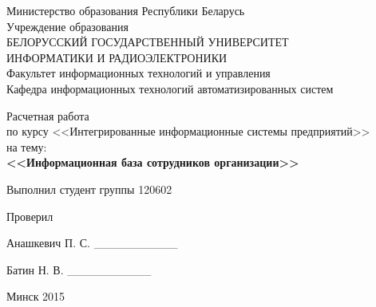 \begin{titlepage}
\thispagestyle{empty}
\setlength{\parindent}{0ex} %

\begin{center}
  Министерство образования Республики Беларусь \\
  \smallskip
  Учреждение образования \\
  БЕЛОРУССКИЙ ГОСУДАРСТВЕННЫЙ УНИВЕРСИТЕТ \\
  ИНФОРМАТИКИ И РАДИОЭЛЕКТРОНИКИ \\
  \smallskip
  Факультет информационных технологий и управления \\
  \smallskip
  Кафедра информационных технологий автоматизированных систем
\end{center}

\vspace{50mm}

\begin{center}
  Расчетная работа \\
  по курсу <<Интегрированные информационные системы предприятий>> \\
  на тему: \\
  \textbf{<<Информационная база сотрудников организации>>} \\
\end{center}

\vspace{30mm}

\begin{minipage}{.45\linewidth}
    Выполнил студент группы 120602

    \smallskip

    Проверил
\end{minipage}
\hfill
\begin{minipage}{.45\linewidth}
  \begin{flushright}
  Анашкевич П. С. \_\_\_\_\_\_\_\_\_\_

  \smallskip

  Батин Н. В. \_\_\_\_\_\_\_\_\_\_
  \end{flushright}
\end{minipage}

\vspace{60mm}
\begin{center}
  Минск 2015
\end{center}

\setlength{\parindent}{5ex} %
\end{titlepage}